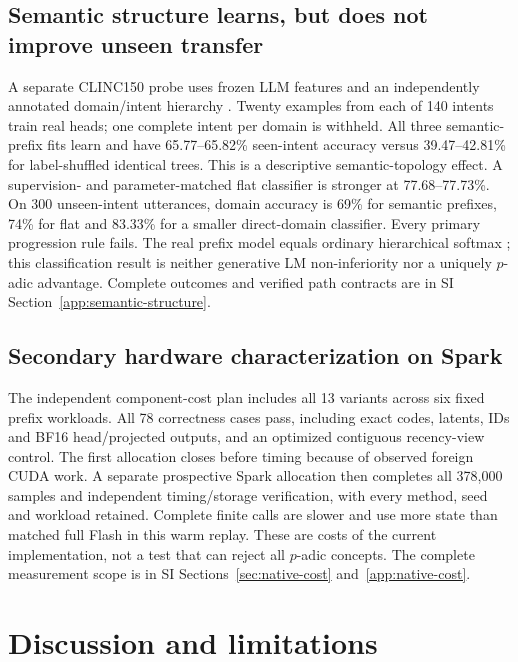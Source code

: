 \documentclass[11pt]{article}
\begin{document}
\subsection{Semantic structure learns, but does not improve unseen transfer}

A separate CLINC150 probe uses frozen LLM features and an independently
annotated domain/intent hierarchy \citep{larson2019clinc}. Twenty examples
from each of 140 intents train real heads; one complete intent per domain
is withheld. All three semantic-prefix fits learn and have 65.77--65.82\%
seen-intent accuracy versus 39.47--42.81\% for label-shuffled identical trees.
This is a descriptive semantic-topology effect. A supervision- and
parameter-matched flat classifier is stronger at 77.68--77.73\%.
On 300 unseen-intent utterances, domain accuracy is 69\% for semantic
prefixes, 74\% for flat and 83.33\% for a smaller direct-domain classifier.
Every primary progression rule fails. The real prefix model equals ordinary
hierarchical softmax \citep{morin2005hierarchical}; this classification
result is neither generative LM non-inferiority nor a uniquely \(p\)-adic
advantage. Complete outcomes and verified path contracts are in SI
Section~\ref{app:semantic-structure}.

\subsection{Secondary hardware characterization on Spark}

The independent component-cost plan includes all 13 variants across six
fixed prefix workloads. All 78 correctness cases pass, including exact
codes, latents, IDs and BF16 head/projected outputs, and an optimized
contiguous recency-view control. The first allocation closes before timing
because of observed foreign CUDA work. A separate prospective Spark allocation
then completes all 378,000 samples and independent timing/storage verification,
with every method, seed and workload retained. Complete finite calls are
slower and use more state than matched full Flash in this warm replay.
These are costs of the current implementation, not a test that can reject
all \(p\)-adic concepts. The complete measurement scope is in SI
Sections~\ref{sec:native-cost} and~\ref{app:native-cost}.

\section{Discussion and limitations}
\end{document}
